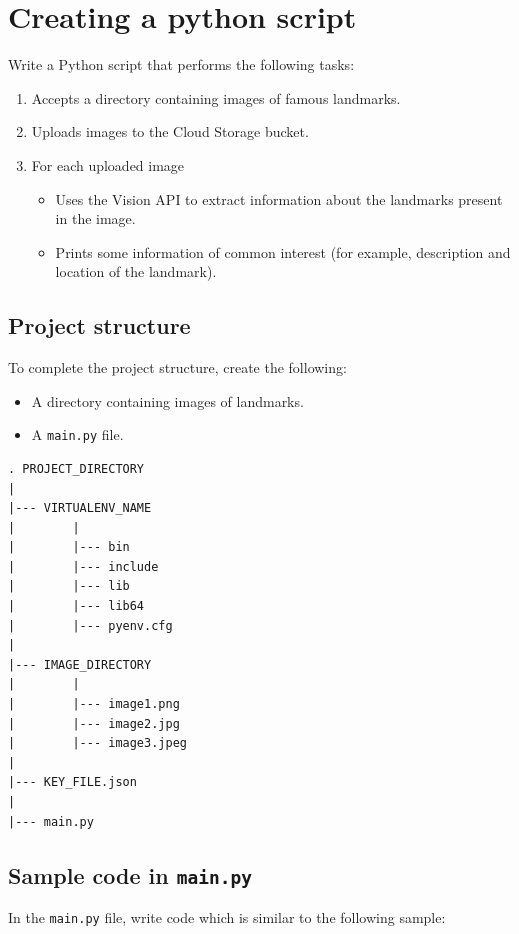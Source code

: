 \documentclass{article}
\begin{document}
\section*{Creating a python script}

Write a Python script that performs the following tasks:

\begin{enumerate}
    \item Accepts a directory containing images of famous landmarks.
    \item Uploads images to the Cloud Storage bucket.
    \item For each uploaded image
    \begin{itemize}
        \item Uses the Vision API to extract information about the landmarks present in the image.
        \item Prints some information of common interest (for example, description and location of the landmark).
    \end{itemize}
\end{enumerate}

\subsection*{Project structure}

To complete the project structure, create the following:

\begin{itemize}
    \item A directory containing images of landmarks.
    \item A \texttt{main.py} file.
\end{itemize}

\begin{lstlisting}
. PROJECT_DIRECTORY
|
|--- VIRTUALENV_NAME
|        |
|        |--- bin
|        |--- include
|        |--- lib
|        |--- lib64
|        |--- pyenv.cfg
|
|--- IMAGE_DIRECTORY
|        |
|        |--- image1.png
|        |--- image2.jpg
|        |--- image3.jpeg
|
|--- KEY_FILE.json
|
|--- main.py
\end{lstlisting}

\subsection*{Sample code in \texttt{main.py}}

In the \texttt{main.py} file, write code which is similar to the following sample:
\end{document}

